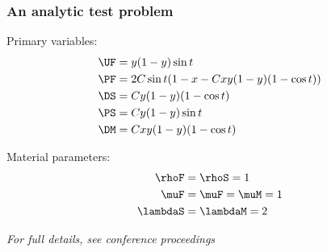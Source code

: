 \begin{frame}
  \frametitle{An analytic test problem}

  Primary variables:
  \begin{displaymath}
    \begin{split}
       \UF &= y(1 - y)\sin{t} \\
       \PF &= 2C\sin{t}(1 - x -Cxy(1 -y)(1 -\cos{t})) \\
       \DS &= Cy(1 - y)(1 - \cos{t})  \\
       \PS &= Cy(1 - y)\sin{t} \\
       \DM &= Cxy(1 -y)(1 -\cos{t}) \\
    \end{split}
  \end{displaymath}

  \bigskip

  Material parameters:
  \begin{displaymath}
    \begin{split}
      \rhoF    &= \rhoS = 1 \\
      \muF     &= \muF = \muM = 1 \\
      \lambdaS &= \lambdaM = 2
    \end{split}
  \end{displaymath}

  \vfill

  \scriptsize
  \textit{For full details, see conference proceedings}

\end{frame}
